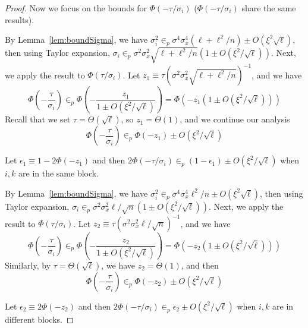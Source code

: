 \begin{proof}
Now we focus on the bounds for $\Phi\left(-\tau/ \sigma_{i}\right)$ ($\Phi\left(-\tau/ \sigma_{i}\right)$ share the same results).


By Lemma~\ref{lem:boundSigma}, we have $\sigma^2_i \in_p \sigma^4\sigma^4_x (\ell+\ell^2/n)  \pm O(\xi^2 \sqrt{\ell})$, then using Taylor expansion, $\sigma_i \in_p \sigma^2\sigma^2_x \sqrt{\ell+\ell^2/n} (1 \pm O(\xi^2 /\sqrt{\ell}))$. Next, we apply the result to $\Phi(\tau/\sigma_i)$. Let $z_1 \equiv \tau(\sigma^2\sigma^2_x \sqrt{\ell+\ell^2/n})^{-1}$, and we have
\begin{equation}
    \Phi\left(-\frac{\tau}{\sigma_i}\right) \in_p  \Phi\left(-\frac{z_1}{1 \pm O(\xi^2 /\sqrt{\ell})}\right) 
    =  \Phi\left(-z_1\left(1\pm O(\xi^2 /\sqrt{\ell})\right) \right) 
\end{equation}
Recall that we set $\tau = \Theta\left(\sqrt{\ell}\right)$, so $z_1 = \Theta(1)$, and we continue our analysis 
\begin{equation}
    \Phi\left(-\frac{\tau}{\sigma_i}\right) \in_p \Phi\left(-z_1 \right) \pm O(\xi^2 /\sqrt{\ell})
\end{equation}

Let $\epsilon_1 \equiv 1 - 2\Phi\left(-z_1 \right)$ and then $2\Phi\left(-\tau/\sigma_i\right) \in_p (1-\epsilon_1) \pm O(\xi^2 /\sqrt{\ell})$ when $i,k$ are in the same block.


By Lemma~\ref{lem:boundSigma}, we have $\sigma^2_i \in_p \sigma^4\sigma^4_x \ell^2/n \pm O(\xi^2 \sqrt{\ell})$, then using Taylor expansion, $\sigma_i \in_p \sigma^2\sigma^2_x\ell/\sqrt{n}(1 \pm O(\xi^2 /\sqrt{\ell}))$. Next, we apply the result to $\Phi(\tau/\sigma_i)$. Let $z_2 \equiv \tau(\sigma^2\sigma^2_x \ell/\sqrt{n})^{-1}$, and we have
\begin{equation}
    \Phi\left(-\frac{\tau}{\sigma_i}\right) \in_p  \Phi\left(-\frac{z_2}{1 \pm O(\xi^2 /\sqrt{\ell})}\right) 
    =  \Phi\left(-z_2\left(1\pm O(\xi^2 /\sqrt{\ell})\right) \right) 
\end{equation}
Similarly, by $\tau = \Theta\left(\sqrt{\ell}\right)$, we have $z_2 = \Theta(1)$, and then 
\begin{equation}
    \Phi\left(-\frac{\tau}{\sigma_i}\right) \in_p \Phi\left(-z_2 \right) \pm O(\xi^2 /\sqrt{\ell})
\end{equation}

Let $\epsilon_2 \equiv 2\Phi\left(-z_2 \right)$ and then $2\Phi\left(-\tau/\sigma_i\right) \in_p \epsilon_2 \pm O(\xi^2 /\sqrt{\ell})$ when $i,k$ are in different blocks.


\end{proof}
